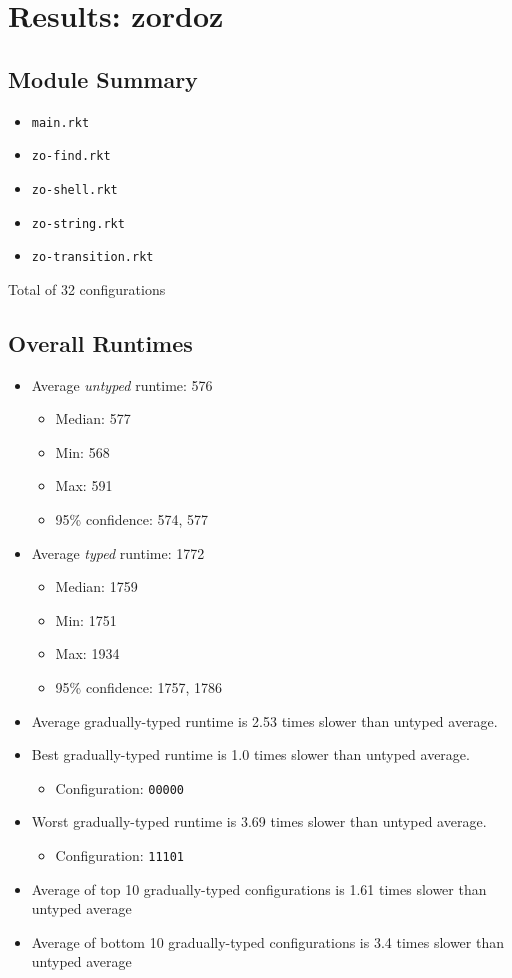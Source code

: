\documentclass{article}
\newcommand{\mono}[1]{\texttt{#1}}
\begin{document}
\section{Results: zordoz}

\subsection{Module Summary}
\begin{itemize}
\item \mono{main.rkt}
\item \mono{zo-find.rkt}
\item \mono{zo-shell.rkt}
\item \mono{zo-string.rkt}
\item \mono{zo-transition.rkt}\end{itemize}
Total of 32 configurations

\subsection{Overall Runtimes}
\begin{itemize}
\item Average \emph{untyped} runtime: 576
  \begin{itemize}
  \item Median: 577
  \item Min: 568
  \item Max: 591
  \item 95\% confidence: 574, 577
  \end{itemize}
\item Average \emph{typed} runtime: 1772
  \begin{itemize}
  \item Median: 1759
  \item Min: 1751
  \item Max: 1934
  \item 95\% confidence: 1757, 1786
  \end{itemize}
\item Average gradually-typed runtime is 2.53 times slower than untyped average.
\item Best gradually-typed runtime is 1.0 times slower than untyped average.
\begin{itemize}\item Configuration: \mono{00000}\end{itemize}
\item Worst gradually-typed runtime is 3.69 times slower than untyped average.
\begin{itemize}\item Configuration: \mono{11101}\end{itemize}
\item Average of top 10 gradually-typed configurations is 1.61 times slower than untyped average
\item Average of bottom 10 gradually-typed configurations is 3.4 times slower than untyped average
\end{itemize}
\end{document}
